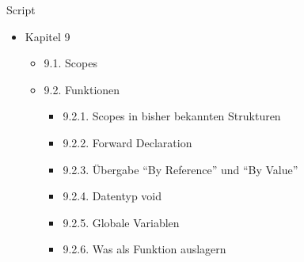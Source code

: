 
\begin{frame}[t,plain]
\titlepage
\end{frame}


\begin{frame}{Script}
%
\begin{itemize}
\item Kapitel 9
	\begin{itemize}
	\item 9.1. Scopes
	\item 9.2. Funktionen
		\begin{itemize}
		\item 9.2.1. Scopes in bisher bekannten Strukturen
		\item 9.2.2. Forward Declaration
		\item 9.2.3. Übergabe \enquote{By Reference} und \enquote{By Value}
		\item 9.2.4. Datentyp void
		\item 9.2.5. Globale Variablen
		\item 9.2.6. Was als Funktion auslagern
		\end{itemize}
	\end{itemize}
\end{itemize}
%
\end{frame}


